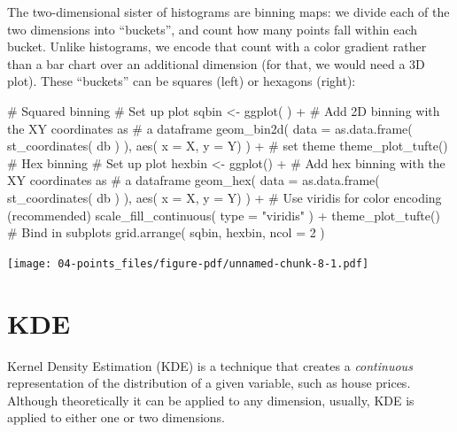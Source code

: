 \documentclass[
  letterpaper,
  DIV=11,
  numbers=noendperiod,
  oneside]{scrreprt}
\newenvironment{Shaded}{\begin{snugshade}}{\end{snugshade}}
\newcommand{\AttributeTok}[1]{\textcolor[rgb]{0.40,0.45,0.13}{#1}}
\newcommand{\CommentTok}[1]{\textcolor[rgb]{0.37,0.37,0.37}{#1}}
\newcommand{\DecValTok}[1]{\textcolor[rgb]{0.68,0.00,0.00}{#1}}
\newcommand{\FunctionTok}[1]{\textcolor[rgb]{0.28,0.35,0.67}{#1}}
\newcommand{\NormalTok}[1]{\textcolor[rgb]{0.00,0.23,0.31}{#1}}
\newcommand{\OtherTok}[1]{\textcolor[rgb]{0.00,0.23,0.31}{#1}}
\newcommand{\SpecialCharTok}[1]{\textcolor[rgb]{0.37,0.37,0.37}{#1}}
\newcommand{\StringTok}[1]{\textcolor[rgb]{0.13,0.47,0.30}{#1}}
\begin{document}
The two-dimensional sister of histograms are binning maps: we divide
each of the two dimensions into ``buckets'', and count how many points
fall within each bucket. Unlike histograms, we encode that count with a
color gradient rather than a bar chart over an additional dimension (for
that, we would need a 3D plot). These ``buckets'' can be squares (left)
or hexagons (right):

\begin{Shaded}
\begin{Highlighting}[]
      \CommentTok{\# Squared binning}
\CommentTok{\# Set up plot}
\NormalTok{sqbin }\OtherTok{\textless{}{-}} \FunctionTok{ggplot}\NormalTok{( ) }\SpecialCharTok{+} 
\CommentTok{\# Add 2D binning with the XY coordinates as}
\CommentTok{\# a dataframe}
  \FunctionTok{geom\_bin2d}\NormalTok{(}
    \AttributeTok{data =} \FunctionTok{as.data.frame}\NormalTok{( }\FunctionTok{st\_coordinates}\NormalTok{( db ) ), }
    \FunctionTok{aes}\NormalTok{( }\AttributeTok{x =}\NormalTok{ X, }\AttributeTok{y =}\NormalTok{ Y)}
\NormalTok{  ) }\SpecialCharTok{+} 
  \CommentTok{\# set theme }
  \FunctionTok{theme\_plot\_tufte}\NormalTok{()}
      \CommentTok{\# Hex binning}
\CommentTok{\# Set up plot}
\NormalTok{hexbin }\OtherTok{\textless{}{-}} \FunctionTok{ggplot}\NormalTok{() }\SpecialCharTok{+}
\CommentTok{\# Add hex binning with the XY coordinates as}
\CommentTok{\# a dataframe }
  \FunctionTok{geom\_hex}\NormalTok{(}
    \AttributeTok{data =} \FunctionTok{as.data.frame}\NormalTok{( }\FunctionTok{st\_coordinates}\NormalTok{( db ) ),}
    \FunctionTok{aes}\NormalTok{( }\AttributeTok{x =}\NormalTok{ X, }\AttributeTok{y =}\NormalTok{ Y)}
\NormalTok{  ) }\SpecialCharTok{+}
\CommentTok{\# Use viridis for color encoding (recommended)}
  \FunctionTok{scale\_fill\_continuous}\NormalTok{( }\AttributeTok{type =} \StringTok{"viridis"}\NormalTok{ ) }\SpecialCharTok{+}
  \FunctionTok{theme\_plot\_tufte}\NormalTok{()}
      \CommentTok{\# Bind in subplots}
\FunctionTok{grid.arrange}\NormalTok{( sqbin, hexbin, }\AttributeTok{ncol =} \DecValTok{2}\NormalTok{ ) }
\end{Highlighting}
\end{Shaded}

\texttt{[image: 04-points\_files/figure-pdf/unnamed-chunk-8-1.pdf]}

\section{KDE}\label{kde}

Kernel Density Estimation (KDE) is a technique that creates a
\emph{continuous} representation of the distribution of a given
variable, such as house prices. Although theoretically it can be applied
to any dimension, usually, KDE is applied to either one or two
dimensions.
\end{document}
